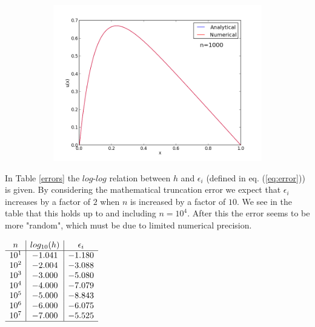 \documentclass[12pt, a4paper]{article}
\begin{document}
\begin{figure}[ht!]
\begin{subfigure}[b]{0.495\textwidth}
        \includegraphics[width=\textwidth]{../plot_n_1000.png}
        \caption{}
  \end{subfigure}
  \caption{} 
  \label{plots}
\end{figure}

In Table \ref{errors} the $log$-$log$ relation between $h$ and $\epsilon_i$ (defined in eq. 
(\ref{eq:error})) is given. By considering the mathematical truncation error we expect that $\epsilon_i$ 
increases by a factor of $2$ when $n$ is increased by a factor of $10$. We see in the table that this 
holds up to and including $n=10^4$. After this the error seems to be more "random", which must be due to 
limited numerical precision.

\begin{table}[H]
\begin{center}
$\begin{array}{c|c|c} 
n & log_{10}(h) & \epsilon_i \\ \hline 
10^1 & -1.041 & -1.180 \\ 
10^2 & -2.004 & -3.088 \\ 
10^3 & -3.000 & -5.080 \\  
10^4 & -4.000 & -7.079 \\ 
10^5 & -5.000 & -8.843 \\ 
10^6 & -6.000 & -6.075 \\ 
10^7 & -7.000 & -5.525 \\ \hline 
\end{array}$
\end{center}
\caption{}
\label{errors}
\end{table}
\end{document}
